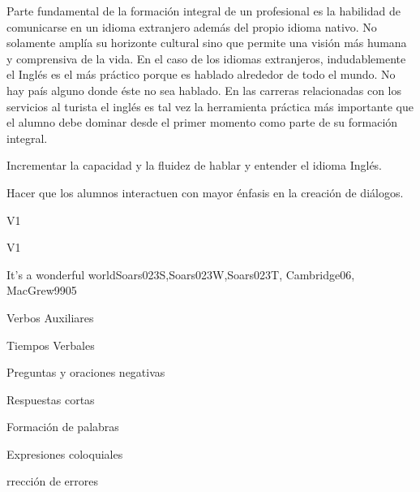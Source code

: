\begin{syllabus}


\begin{justification}
Parte fundamental de la formación integral de un profesional es la 
habilidad de comunicarse en un idioma extranjero además del propio idioma 
nativo. No solamente amplía su horizonte cultural sino que permite una visión 
más humana y comprensiva de la vida. En el caso de los idiomas extranjeros, 
indudablemente el Inglés es el más práctico porque es hablado alrededor de 
todo el mundo. No hay país alguno donde éste no sea hablado. En las carreras 
relacionadas con los servicios al turista el inglés es tal vez la herramienta 
práctica más importante que el alumno debe dominar desde el primer momento 
como parte de su formación integral.
\end{justification}

\begin{goals}
\item Incrementar la capacidad y la fluidez de hablar y entender el idioma Inglés.
\item Hacer que los alumnos interactuen con mayor énfasis en la creación de diálogos.
\end{goals}

\begin{competences}{V1}
    \item {}
\end{competences}

\begin{outcomes}{V1}
\item {}
\item {}
\end{outcomes}

\begin{unit}{It's a wonderful world}{Soars023S,Soars023W,Soars023T, Cambridge06, MacGrew99}{0}{5}
   \begin{topics}
      \item Verbos Auxiliares
      \item Tiempos Verbales 
      \item Preguntas y oraciones negativas
      \item Respuestas cortas 
      \item Formación de palabras
      \item Expresiones coloquiales
      \item rrección de errores 
   \end{topics}


\end{unit}
\end{syllabus}
